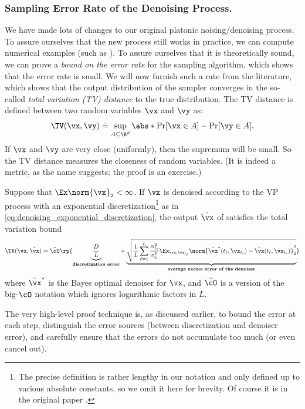 \documentclass[../../book-main.tex]{subfiles}
\begin{document}
\subsubsection{Sampling Error Rate of the Denoising Process.}
We have made lots of changes to our original platonic noising/denoising process. To assure ourselves that the new process still works in practice, we can compute numerical examples (such as ). To assure ourselves that it is theoretically sound, we can prove a \textit{bound on the error rate} for the sampling algorithm, which shows that the error rate is small. We will now furnish such a rate from the literature, which shows that the output distribution of the sampler converges in the so-called \textit{total variation (TV) distance} to the true distribution. The TV distance is defined between two random variables \(\vx\) and \(\vy\) as:
\begin{equation}
	\TV(\vx, \vy) \doteq \sup_{A \subseteq \R^{d}}\abs*{\Pr[\vx \in A] - \Pr[\vy \in A]}.
\end{equation}
If \(\vx\) and \(\vy\) are very close (uniformly), then the supremum will be small. So the TV distance measures the closeness of random variables. (It is indeed a metric, as the name suggests; the proof is an exercise.)

\begin{theorem}\label{thm:diffusion_sampler_convergence}
	Suppose that \(\Ex\norm{\vx}_{2} < \infty\).  If \(\vx\) is denoised according to the VP process with an exponential discretization\footnote{The precise definition is rather lengthy in our notation and only defined up to various absolute constants, so we omit it here for brevity. Of course it is in the original paper \citep{li2024d}.} as in \eqref{eq:denoising_exponential_discretization}, the output \(\hat{\vx}\) of  satisfies the total variation bound
	\begin{equation}\label{eq:diffusion_sampling_error}
		\TV(\vx, \hat{\vx}) = \tilde{\cO}\rp{\underbrace{\frac{D}{L}}_{\textbf{discretization error}} + \underbrace{\sqrt{\frac{1}{L}\sum_{\ell = 1}^{L}\frac{\alpha_{t_{\ell}}^{2}}{\sigma_{t_{\ell}}^{4}}\Ex_{\vx, \vx_{t_{\ell}}}\norm{\bar{\vx}^{\ast}(t_{\ell}, \vx_{t_{\ell}}) - \bar{\vx}(t_{\ell}, \vx_{t_{\ell}})}_{2}^{2}}}_{\textbf{average excess error of the denoiser}}}
	\end{equation}
	where \(\bar{\vx}^{\ast}\) is the Bayes optimal denoiser for \(\vx\), and \(\tilde{\cO}\) is a version of the big-\(\cO\) notation which ignores logarithmic factors in \(L\).
\end{theorem}
The very high-level proof technique is, as discussed earlier, to bound the error at each step, distinguish the error sources (between discretization and denoiser error), and carefully ensure that the errors do not accumulate too much (or even cancel out). 
\end{document}
